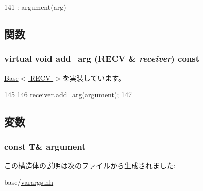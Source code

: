 \begin{DoxyCode}
141 : argument(arg) {}
\end{DoxyCode}


\subsection{関数}
\hypertarget{structVarArgs_1_1Any_ab9c3a36cee779f61ec3d8d4d3db17f87}{
\subsubsection[{add\_\-arg}]{\setlength{\rightskip}{0pt plus 5cm}virtual void add\_\-arg (RECV \& {\em receiver}) const}}
\label{structVarArgs_1_1Any_ab9c3a36cee779f61ec3d8d4d3db17f87}


\hyperlink{structVarArgs_1_1Base_ab6d5cea89e524f1ebe6ae84147552b0c}{Base$<$ RECV $>$}を実装しています。


\begin{DoxyCode}
145     {
146         receiver.add_arg(argument);
147     }
\end{DoxyCode}


\subsection{変数}
\hypertarget{structVarArgs_1_1Any_a1d0f3ec673f49f5eb4a58d64ae70fb5e}{
\subsubsection[{argument}]{\setlength{\rightskip}{0pt plus 5cm}const T\& {\bf argument}}}
\label{structVarArgs_1_1Any_a1d0f3ec673f49f5eb4a58d64ae70fb5e}


この構造体の説明は次のファイルから生成されました:\begin{DoxyCompactItemize}
\item 
base/\hyperlink{varargs_8hh}{varargs.hh}\end{DoxyCompactItemize}
